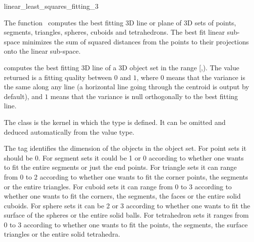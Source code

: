 
\begin{ccRefFunction}{linear_least_squares_fitting_3}  

\ccDefinition
  
The function \ccRefName\ computes the best fitting 3D line or plane of 3D sets of points, segments, triangles, spheres, cuboids and tetrahedrons. The best fit linear sub-space minimizes the sum of squared distances from the points to their projections onto the linear sub-space.


{ computes the best fitting 3D line of a 3D object set in the range
[,). The value returned is a fitting quality
between $0$ and $1$, where $0$ means that the variance is the same
along any line (a horizontal line going through the centroid is output
by default), and $1$ means that the variance is null orthogonally
to the best fitting line. }

The class  is the kernel in which the type
 is defined. It can be omitted and
deduced automatically from the value type.

The tag  identifies the dimension of the objects in the object set. For point sets it should be 0. For segment sets it could be 1 or 0 according to whether one wants to fit the entire segments or just the end points. For triangle sets it can range from 0 to 2 according to whether one wants to fit the corner points, the segments or the entire triangles. For cuboid sets it can range from 0 to 3 according to whether one wants to fit the corners, the segments, the faces or the entire solid cuboids. For sphere sets it can be 2 or 3 according to whether one wants to fit the surface of the spheres or the entire solid balls. For tetrahedron sets it ranges from 0 to 3 according to whether one wants to fit the points, the segments, the surface triangles or the entire solid tetrahedra.


\end{ccRefFunction}
